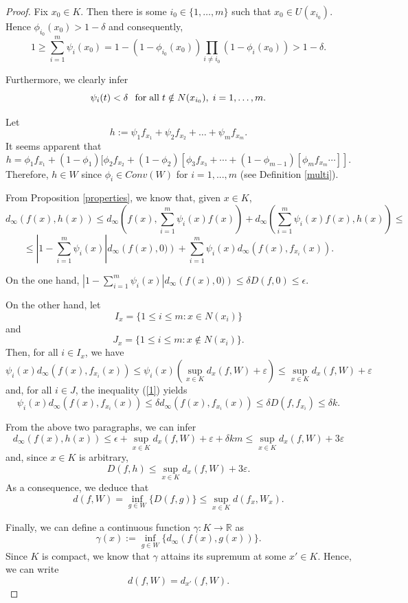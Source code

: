 \documentclass[12pt]{amsart}
\begin{document}
\begin{proof}
Fix $x_0\in K$. Then there is some $i_0\in \{1, \ldots, m\}$ such that $x_0\in U(x_{i_0})$. Hence $\phi_{i_0}(x_0)> 1 - \delta$ and consequently,
\[1\ge \sum_{i=1}^{m}\psi_i(x_0)=1-(1 - \phi_{i_0}(x_0)) \prod_{i \not= i_0} ( 1 - \phi_i(x_0))> 1- \delta.\]

Furthermore, we clearly infer
\begin{equation}\label{1}
\psi_i(t) < \delta \hspace{0.1in} {\rm for} \hspace{0.04in} {\rm all} \hspace{0.04in} t \notin N(x_{i_0}), \hspace{0.04in}i = 1, \ldots, m.
\end{equation}

Let
\begin{equation}\label{g}
h := \psi_1 f_{x_1} + \psi_2 f_{x_2} + \ldots + \psi_m f_{x_m}.
\end{equation}
It seems apparent that
$$h= \phi_1 f_{x_1} + ( 1 - \phi_1 ) [\phi_2 f_{x_2} + (1 - \phi_2) [\phi_3 f_{x_3} + \cdots + (1 - \phi_{m-1}) [\phi_m f_{x_m} \cdots]].$$
Therefore, $h \in W$ since $\phi_i\in Conv(W)$ for $i=1,...,m$ (see Definition \ref{multi}).

From Proposition \ref{properties}, we know that, given $x \in K$,
$$d_\infty (f(x), h(x)) \le d_\infty \left(f(x),\sum^m_{i=1} \psi_i (x)f(x)\right) + d_\infty \left(\sum^m_{i=1} \psi_i (x)f(x),h(x)\right)\le $$
$$\le \left|1-\sum^m_{i=1}\psi_i (x)\right|d_\infty \left(f(x), 0)\right) + \sum^m_{i=1}\psi_i (x) d_\infty \left( f(x),f_{x_i}(x)\right).$$

On the one hand, $\left|1-\sum^m_{i=1}\psi_i (x)\right|d_\infty \left(f(x), 0)\right)\le \delta D(f,0) \le \epsilon$.

On the other hand, let $$I_x=\{ 1 \le i \le m: x \in N(x_i) \}$$ and $$J_x=\{ 1 \le i \le m: x \notin N(x_i) \}.$$
Then, for all $i \in I_x$, we have
$$\psi_i (x) d_\infty (f(x), f_{x_i}(x)) \le \psi_i(x) (\sup_{x\in K}d_x(f,W)+\varepsilon)\le \sup_{x\in K}d_x(f,W)+\varepsilon$$
and, for all $i \in J$, the inequality (\ref{1}) yields
$$\psi_i(x) d_\infty (f(x),f_{x_i}(x)) \le \delta d_\infty (f(x),f_{x_i}(x))\le \delta D(f, f_{x_i})\le \delta k.$$

From the above two paragraphs, we can infer
$$d_\infty (f(x), h(x)) \le \epsilon + \sup_{x\in K}d_x(f,W)+\varepsilon + \delta k m \le \sup_{x\in K}d_x(f,W)+3\varepsilon$$
and, since $x\in K$ is arbitrary,
$$D(f,h) \le \sup_{x\in K}d_x(f,W)+3\varepsilon.$$
As a consequence, we deduce that
$$d(f,W)=\inf_{g\in W}\{D(f,g)\}\le \sup_{x\in K}d(f_x,W_x).$$

Finally, we can define a continuous function $\gamma: K\longrightarrow \mathbb{R}$ as
\[\gamma(x):=\inf_{g\in W}\{d_{\infty}(f(x),g(x))\}.\]
Since $K$ is compact, we know that $\gamma$ attains its supremum at some $x'\in K$. Hence, we can write
\[d(f,W)=d_{x'}(f,W).\]

\end{proof}
\end{document}
